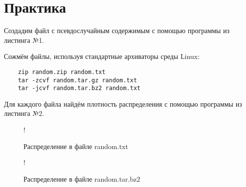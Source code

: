 \section{Практика}


Создадим файл с псевдослучайным содержимым с помощью программы из листинга №1.

Сожмём файлы, используя стандартные архиваторы среды Linux:

\begin{lstlisting}
    zip random.zip random.txt
    tar -zcvf random.tar.gz random.txt
    tar -jcvf random.tar.bz2 random.txt
\end{lstlisting}

Для каждого файла найдём плотность распределения с помощью программы из листинга №2.


\begin{figure}[H]
    \caption{Распределение в файле random.txt}
    \label{fig:1}
    \centering
    \resizebox {.8\textwidth} {!} {
}
\end{figure}

\begin{figure}[H]
    \caption{Распределение в файле random.tar.bz2}
    \label{fig:2}
    \centering
    \resizebox {.8\textwidth} {!} {

    }
    \end{figure}

